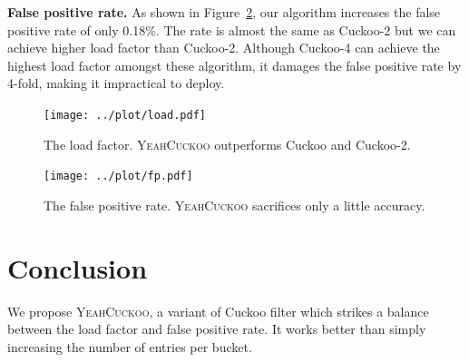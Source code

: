 \documentclass[11pt]{IEEEtran}
\newcommand{\nosection}[1]{\vspace{3pt}\noindent\textbf{#1}}
\newcommand{\sys}{\textsc{YeahCuckoo}\xspace}
\begin{document}
\nosection{False positive rate.} As shown in Figure~\ref{fp}, our algorithm increases the false positive rate of only 0.18\%. The rate is almost the same as Cuckoo-2 but we can achieve higher load factor than Cuckoo-2. Although Cuckoo-4 can achieve the highest load factor amongst these algorithm, it damages the false positive rate by 4-fold, making it impractical to deploy.

\begin{figure}
\centering
\texttt{[image: ../plot/load.pdf]}
\caption{The load factor. \sys outperforms Cuckoo and Cuckoo-2.}
\label{load}
\end{figure}

\begin{figure}
\centering
\texttt{[image: ../plot/fp.pdf]}
\caption{The false positive rate. \sys sacrifices only a little accuracy.}
\label{fp}
\end{figure}

\section{Conclusion}

We propose \sys, a variant of Cuckoo filter which strikes a balance between the load factor and false positive rate. It works better than simply increasing the number of entries per bucket.

 

 
\end{document}
